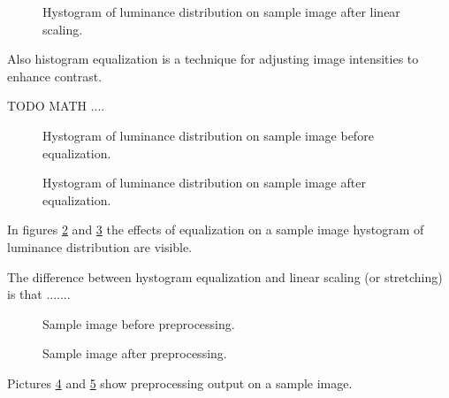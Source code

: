     \begin{figure}
        \caption{Hystogram of luminance distribution on sample image after linear scaling.}\label{fig:luminance_after}
    \end{figure}
    \par{
        Also histogram equalization is a technique for adjusting image intensities to enhance contrast.
    }
    \par{
        TODO MATH ....
    }
    \begin{figure}
        \caption{Hystogram of luminance distribution on sample image before equalization.}\label{fig:equalization_before}
    \end{figure}
    \begin{figure}
        \caption{Hystogram of luminance distribution on sample image after equalization.}\label{fig:equalization_after}
    \end{figure}
    \par{
        In figures \ref{fig:equalization_before} and \ref{fig:equalization_after} the effects of equalization on a sample image hystogram of luminance distribution are visible.
    }
    \par{
        The difference between hystogram equalization and linear scaling (or stretching) is that .......
    }
    \begin{figure}
        \caption{Sample image before preprocessing.}\label{fig:preprocessing_before}
    \end{figure}
    \begin{figure}
        \caption{Sample image after preprocessing.}\label{fig:preprocessing_after}
    \end{figure}
    \par{
        Pictures \ref{fig:preprocessing_before} and \ref{fig:preprocessing_after} show preprocessing output on a sample image.
    }